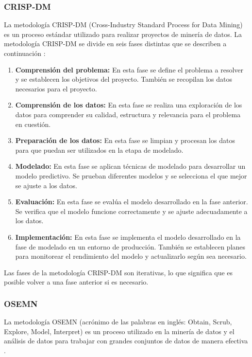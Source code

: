 \subsubsection{CRISP-DM}
La metodología CRISP-DM (Cross-Industry Standard Process for Data Mining) es un proceso estándar utilizado para realizar proyectos de minería de datos. La metodología CRISP-DM se divide en seis fases distintas que se describen a continuación \cite{Crisp-Osemn}:

\begin{enumerate}
    \item \textbf{Comprensión del problema:} En esta fase se define el problema a resolver y se establecen los objetivos del proyecto. También se recopilan los datos necesarios para el proyecto.
    \item \textbf{Comprensión de los datos:} En esta fase se realiza una exploración de los datos para comprender su calidad, estructura y relevancia para el problema en cuestión.
    \item \textbf{Preparación de los datos:} En esta fase se limpian y procesan los datos para que puedan ser utilizados en la etapa de modelado.
    \item \textbf{Modelado:} En esta fase se aplican técnicas de modelado para desarrollar un modelo predictivo. Se prueban diferentes modelos y se selecciona el que mejor se ajuste a los datos.
    \item \textbf{Evaluación:} En esta fase se evalúa el modelo desarrollado en la fase anterior. Se verifica que el modelo funcione correctamente y se ajuste adecuadamente a los datos.
    \item \textbf{Implementación:} En esta fase se implementa el modelo desarrollado en la fase de modelado en un entorno de producción. También se establecen planes para monitorear el rendimiento del modelo y actualizarlo según sea necesario.
\end{enumerate}

Las fases de la metodología CRISP-DM son iterativas, lo que significa que es posible volver a una fase anterior si es necesario.

\subsubsection{OSEMN}

La metodología OSEMN (acrónimo de las palabras en inglés: Obtain, Scrub, Explore, Model, Interpret) es un proceso utilizado en la minería de datos y el análisis de datos para trabajar con grandes conjuntos de datos de manera efectiva \cite{Crisp-Osemn}. 

